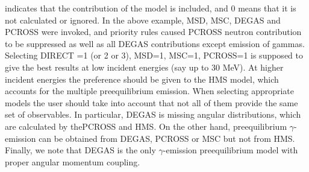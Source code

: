 \documentclass[twocolumn,amsmath,amssymb,10pt,groupedaddress,a4paper]{revtex4}
\begin{document}
 indicates that the contribution of the model is included,
and 0 means that it is not calculated or ignored. In the above example,
MSD, MSC, DEGAS and PCROSS
were invoked, and priority rules caused PCROSS neutron contribution
to be suppressed as well as all DEGAS contributions except emission
of gammas.
Selecting DIRECT =1 (or 2 or 3), MSD=1, MSC=1, PCROSS=1 is supposed
to give the best results at low incident energies (say up to 30 MeV).
At higher incident energies the preference should be given to the
HMS model, which accounts for the multiple preequilibrium
emission. When selecting appropriate models the user should take into
account that not all of them provide the same set of observables.
In particular, DEGAS is missing angular distributions,
which are calculated by thePCROSS and HMS. On the other hand, preequilibrium
$\gamma$-emission can be obtained from DEGAS, PCROSS or MSC
but not from HMS. Finally, we note that DEGAS is the only $\gamma$-emission
preequilibrium model with proper angular momentum coupling.
\end{document}
